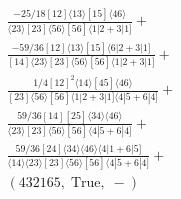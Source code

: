 \documentclass[varwidth, border=5pt]{standalone}
\begin{document}
\begin{my}
$\begin{gathered}
\scriptscriptstyle\frac{-25/18[12]⟨13⟩[15]⟨46⟩}{⟨23⟩[23]⟨56⟩[56]⟨1|2+3|1]}+\\
\scriptscriptstyle\frac{-59/36[12]⟨13⟩[15]⟨6|2+3|1]}{[14]⟨23⟩[23]⟨56⟩[56]⟨1|2+3|1]}+\\
\scriptscriptstyle\frac{1/4[12]^2⟨14⟩[45]⟨46⟩}{[23]⟨56⟩[56]⟨1|2+3|1]⟨4|5+6|4]}+\\
\scriptscriptstyle\frac{59/36[14][25]⟨34⟩⟨46⟩}{⟨23⟩[23]⟨56⟩[56]⟨4|5+6|4]}+\\
\scriptscriptstyle\frac{59/36[24]⟨34⟩⟨46⟩⟨4|1+6|5]}{⟨14⟩⟨23⟩[23]⟨56⟩[56]⟨4|5+6|4]}+\\
\scriptscriptstyle(432165,\;\text{True},\;-)\phantom{+}
\end{gathered}$
\end{my}
\end{document}
